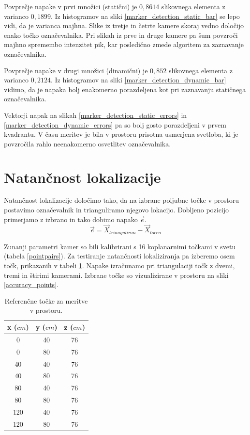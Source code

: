 \documentclass[a4paper, 12pt]{book}
\begin{document}
Povprečje napake v prvi množici (statični) je $0,8614$ slikovnega elementa z varianco $0,1899$. Iz histogramov na sliki \ref{marker_detection_static_bar} se lepo vidi, da je varianca majhna. Slike iz tretje in četrte kamere skoraj vedno določijo enako točko označevalnika. Pri slikah iz prve in druge kamere pa šum povzroči majhno spremembo intenzitet pik, kar posledično zmede algoritem za zaznavanje označevalnika.

Povprečje napake v drugi množici (dinamični) je $0,852$ slikovnega elementa z varianco $0,2124$. Iz histogramov na sliki \ref{marker_detection_dynamic_bar} vidimo, da je napaka bolj enakomerno porazdeljena kot pri zaznavanju statičnega označevalnika.

Vektorji napak na slikah \ref{marker_detection_static_errors} in \ref{marker_detection_dynamic_errors} pa so bolj gosto porazdeljeni v prvem kvadrantu. V času meritev je bila v prostoru prisotna usmerjena svetloba, ki je povzročila rahlo neenakomerno osvetlitev označevalnika.

\section{Natančnost lokalizacije}
Natančnost lokalizacije določimo tako, da na izbrane poljubne točke v prostoru postavimo označevalnik in trianguliramo njegovo lokacijo. Dobljeno pozicijo primerjamo z izbrano in tako dobimo napako $\vec{e}$.
\begin{equation}
\vec{e} = \vec{X}_{trianguliran} - \vec{X}_{tocen}
\end{equation}

Zunanji parametri kamer so bili kalibrirani s 16 koplanarnimi točkami v svetu (tabela \ref{pointpairs}). Za testiranje natančnosti lokaliziranja pa izberemo osem točk, prikazanih v tabeli \ref{measuringptstab}. Napake izračunamo pri triangulaciji točk z dvemi, tremi in štirimi kamerami. Izbrane točke so vizualizirane v prostoru na sliki \ref{accuracy_points}.

\begin{table}[H]
\centering
\begin{tabular}{| c | c | c |}
\hline
x ($cm$) & y ($cm$) & z ($cm$) \\
\hline
0 & 40 & 76 \\
0 & 80 & 76 \\
40 & 40 & 76 \\
40 & 80 & 76 \\
80 & 40 & 76 \\
80 & 80 & 76 \\
120 & 40 & 76 \\
120 & 80 & 76 \\
\hline
\end{tabular}
\caption{Referenčne točke za meritve v prostoru.}
\label{measuringptstab}
\end{table}
\end{document}
